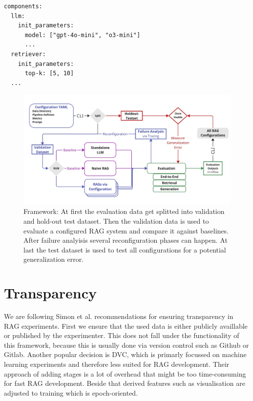 \begin{verbatim}
components:
  llm:
    init_parameters:
      model: ["gpt-4o-mini", "o3-mini"]
      ...
  retriever:
    init_parameters:
      top-k: [5, 10]
  ...
\end{verbatim}


\begin{figure}[h]
  \centering
  \includegraphics[width=\textwidth]{images/FrameworkFull.pdf}
  \caption{Framework: At first the evaluation data get splitted into validation and hold-out test dataset. Then the validation data is used to evaluate a configured RAG system and compare it against baselines. After failure analyisis several reconfiguration phases can happen. At last the test dataset is used to test all configurations for a potential generalization error.}
  \label{fig:framework-full}
\end{figure}


\section{Transparency}

We are following Simon et al.\cite{Simon.10112024} recommendations for ensuring transparency in RAG experiments. First we ensure that the used data is either publicly availlable or published by the experimenter. This does not fall under the functionality of this framework, because this is usually done via version control such as Github\cite{github-inc-2025} or Gitlab\cite{gitlab-inc-2025}. Another popular decision is DVC\cite{dvc.17.03.2025}, which is primarly focussed on machine learning experiments and therefore less suited for RAG development. Their approach of adding stages is a lot of overhead that might be too time-consuming for fast RAG development. Beside that derived features such as visualisation are adjusted to training which is epoch-oriented. 

